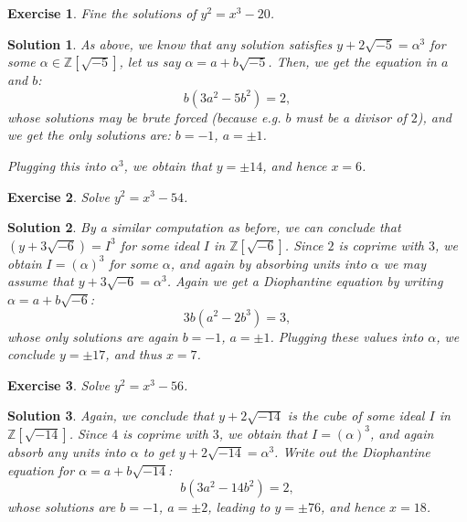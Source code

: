 \documentclass{article}
\newtheorem{ex}{Exercise}
\theoremstyle{nonumberplain}
\newtheorem{sol}{Solution}
\newcommand{\Z}{\mathbb{Z}}
\begin{document}
\begin{ex}
Fine the solutions of $y^2 = x^3 - 20$.
\end{ex}

\begin{sol}
As above, we know that any solution satisfies $y + 2\sqrt{-5} = \alpha^3$ for some $\alpha \in \Z[\sqrt{-5}]$, let us say $\alpha = a + b \sqrt{-5}$. Then, we get the equation in $a$ and $b$:
\begin{equation}
b (3 a^2 - 5 b^2) = 2,
\end{equation}
whose solutions may be brute forced (because e.g. $b$ must be a divisor of $2$), and we get the only solutions are: $b = -1$, $a = \pm 1$.

Plugging this into $\alpha^3$, we obtain that $y = \pm14$, and hence $x = 6$.
\end{sol}

\begin{ex}
Solve $y^2 = x^3 - 54$.
\end{ex}

\begin{sol}
By a similar computation as before, we can conclude that $(y + 3 \sqrt{-6}) = I^3$ for some ideal $I$ in $\Z[\sqrt{-6}]$. Since $2$ is coprime with $3$, we obtain $I = (\alpha)^3$ for some $\alpha$, and again by absorbing units into $\alpha$ we may assume that $y + 3 \sqrt{-6} = \alpha^3$. Again we get a Diophantine equation by writing $\alpha = a + b \sqrt{-6}$:
\begin{equation}
3 b (a^2 - 2b^3) = 3,
\end{equation}
whose only solutions are again $b = -1$, $a = \pm 1$. Plugging these values into $\alpha$, we conclude $y = \pm17$, and thus $x = 7$.
\end{sol}

\begin{ex}
Solve $y^2 = x^3 - 56$.
\end{ex}

\begin{sol}
Again, we conclude that $y + 2 \sqrt{-14}$ is the cube of some ideal $I$ in $\Z[\sqrt{-14}]$. Since $4$ is coprime with $3$, we obtain that $I = (\alpha)^3$, and again absorb any units into $\alpha$ to get $y + 2 \sqrt{-14} = \alpha^3$. Write out the Diophantine equation for $\alpha = a + b \sqrt{-14}$:
\begin{equation}
b (3 a^2 - 14 b^2) = 2,
\end{equation}
whose solutions are $b = -1$, $a = \pm 2$, leading to $y = \pm 76$, and hence $x = 18$.
\end{sol}
\end{document}
